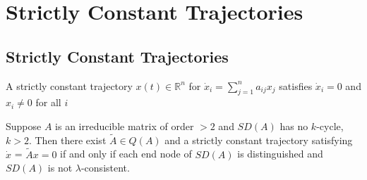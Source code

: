 \chapter{Strictly Constant Trajectories}

\section{Strictly Constant Trajectories}
\begin{dfn}
	A strictly constant trajectory $x(t) \in \mathbb{R}^n$ for $\dot{x}_i = \sum_{j=1}^n a_{ij}x_j$ satisfies $\dot{x}_i = 0$ and $x_i \neq 0$ for all $i$
\end{dfn}
\begin{thm}
	Suppose $A$ is an irreducible matrix of order $> 2$ and $SD(A)$ has no $k$-cycle, $k > 2$. Then there exist $\tilde{A} \in Q(A)$ and a strictly constant trajectory satisfying $\dot{x}$ = $\tilde{A}x = 0$ if and only if each end node of $SD(A)$ is distinguished and $SD(A)$ is not $\lambda$-consistent.
\end{thm}

